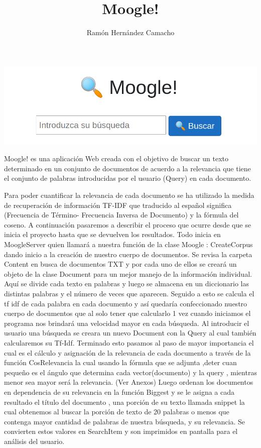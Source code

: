 \documentclass[12pt]{article}
\title{Moogle!}
\author{Ramón Hernández Camacho}
\begin{document}
\begin{center}

    \includegraphics[width=14cm]{moogle.png}

\end{center}
Moogle! es una aplicación Web creada con el objetivo de buscar un texto determinado
en un conjunto de documentos de acuerdo a la relevancia que tiene el conjunto de
palabras introducidas por el usuario (Query) en cada documento.

Para poder cuantificar la relevancia de cada documento se ha utilizado la medida de
recuperación de información TF-IDF que traducido al español significa (Frecuencia de
Término- Frecuencia Inversa de Documento) y la fórmula del coseno.
A continuación pasaremos a describir el proceso que ocurre desde que se inicia el
proyecto hasta que se devuelven los resultados.
Todo inicia en MoogleServer quien llamará a nuestra función de la clase Moogle :
CreateCorpus dando inicio a la creación de nuestro cuerpo de documentos. Se revisa
la carpeta Content en busca de documentos TXT y por cada uno de ellos se creará un
objeto de la clase Document para un mejor manejo de la información individual. Aquí se
divide cada texto en palabras y luego se almacena en un diccionario las distintas
palabras y el número de veces que aparecen. Seguido a esto se calcula el tf idf de
cada palabra en cada documento y así quedaría confeccionado nuestro cuerpo de
documentos que al solo tener que calcularlo 1 vez cuando iniciamos el programa nos
brindará una velocidad mayor en cada búsqueda.
Al introducir el usuario una búsqueda se creara un nuevo Document con la Query al
cual también calcularemos su Tf-Idf. Terminado esto pasamos al paso de mayor
importancia el cual es el cálculo y asignación de la relevancia de cada documento a
través de la función CosRelevancia la cual usando la fórmula que se adjunta ,deter
cuan pequeño es el ángulo que determina cada vector(documento) y la query ,
mientras menor sea mayor será la relevancia.
(Ver Anexos)
Luego ordenan los documentos en dependencia de su relevancia en la función Biggest
y se le asigna a cada resultado el título del documento , una porción de su texto
llamada snippet la cual obtenemos al buscar la porción de texto de 20 palabras o
menos que contenga mayor cantidad de palabras de nuestra búsqueda, y su
relevancia. Se convierten estos valores en SearchItem y son imprimidos en pantalla
para el análisis del usuario.
\end{document}
